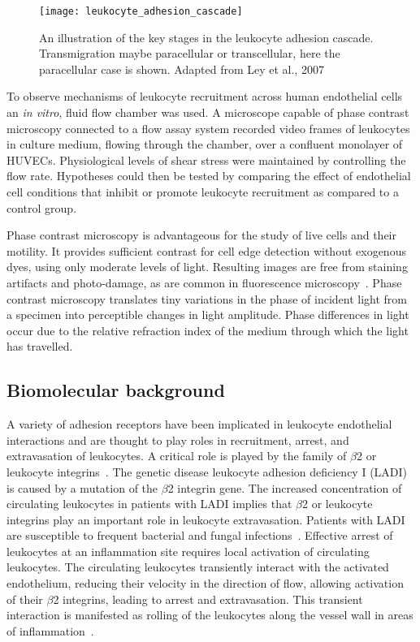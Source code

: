 \begin{figure}[htbp!]
	\centering
	\texttt{[image: leukocyte\_adhesion\_cascade]}
	\caption[The leukocyte adhesion cascade]{An illustration of the key stages in the leukocyte adhesion cascade. Transmigration maybe paracellular or transcellular, here the paracellular case is shown. Adapted from Ley et al., 2007~\cite{Ley2007}}
	\label{figure:leukocyte_adhesion_cascade}
\end{figure}

To observe mechanisms of leukocyte recruitment across human endothelial cells an \emph{in vitro}, fluid flow chamber was used. A microscope capable of phase contrast microscopy connected to a flow assay system recorded video frames of leukocytes in culture medium, flowing through the chamber, over a confluent monolayer of HUVECs. Physiological levels of shear stress were maintained by controlling the flow rate. Hypotheses could then be tested by comparing the effect of endothelial cell conditions that inhibit or promote leukocyte recruitment as compared to a control group.

Phase contrast microscopy is advantageous for the study of live cells and their motility. It provides sufficient contrast for cell edge detection without exogenous dyes, using only moderate levels of light. Resulting images are free from staining artifacts and photo-damage, as are common in fluorescence microscopy~\cite{Ambuhl2012}. Phase contrast microscopy translates tiny variations in the phase of incident light from a specimen into perceptible changes in light amplitude. Phase differences in light occur due to the relative refraction index of the medium through which the light has travelled.

\subsection{Biomolecular background}
\label{leukocytes:introduction:biomolecular}
A variety of adhesion receptors have been implicated in leukocyte endothelial interactions and are thought to play roles in recruitment, arrest, and extravasation of leukocytes. A critical role is played by the family of $\beta$2 or leukocyte integrins~\cite{Springer1990, Mayadas1993}. The genetic disease leukocyte adhesion deficiency I (LADI) is caused by a mutation of the $\beta$2 integrin gene. The increased concentration of circulating leukocytes in patients with LADI implies that $\beta$2 or leukocyte integrins play an important role in leukocyte extravasation. Patients with LADI are susceptible to frequent bacterial and fungal infections~\cite{Anderson1987}. Effective arrest of leukocytes at an inflammation site requires local activation of circulating leukocytes. The circulating leukocytes transiently interact with the activated endothelium, reducing their velocity in the direction of flow, allowing activation of their $\beta$2 integrins, leading to arrest and extravasation. This transient interaction is manifested as rolling of the leukocytes along the vessel wall in areas of inflammation~\cite{Mayadas1993, Atherton1972}.

